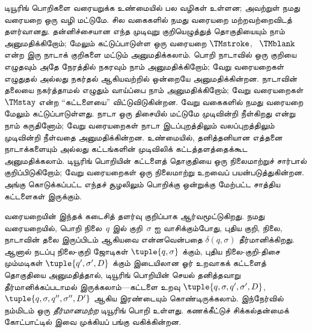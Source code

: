 \documentclass[../../../include/open-logic-section]{subfiles}
\begin{document}


டியூரிங் பொறிகளை வரையறுக்க உண்மையில் பல வழிகள் உள்ளன; அவற்றுள் நமது
வரையறை ஒரு வழி மட்டுமே. சில வகைகளில் நமது வரையறை மற்றவற்றைவிடத்
தளர்வானது. தன்னிச்சையான எந்த முடிவுறு குறியெழுத்துத் தொகுதியையும் நாம்
அனுமதிக்கிறோம்; மேலும் கட்டுப்பாடுள்ள ஒரு வரையறை $\TMstroke$,
~$\TMblank$ என்ற இரு நாடாக் குறிகளை மட்டும் அனுமதிக்கலாம். பொறி
நாடாவில் ஒரு குறியை எழுதவும் அதே நேரத்தில் நகரவும் நாம்
அனுமதிக்கிறோம்; வேறு வரையறைகள் எழுதுதல் அல்லது நகர்தல் ஆகியவற்றில்
ஒன்றையே அனுமதிக்கின்றன. நாடாவின் தலையை நகர்த்தாமல் எழுதும் வாய்ப்பை
நாம் அனுமதிக்கிறோம்; வேறு வரையறைகள் $\TMstay$ என்ற
``கட்டளையை'' விட்டுவிடுகின்றன. வேறு வகைகளில் நமது வரையறை மேலும்
கட்டுப்பாடுள்ளது. நாடா ஒரு திசையில் மட்டுமே முடிவின்றி நீள்கிறது என்று
நாம் கருதினோம்; வேறு வரையறைகள் நாடா இடப்புறத்திலும் வலப்புறத்திலும்
முடிவின்றி நீள்வதை அனுமதிக்கின்றன. உண்மையில், தனித்தனியான எத்தனை
நாடாக்களையும் அல்லது கட்டங்களின் முடிவிலிக் கட்டத்தளத்தைக்கூட
அனுமதிக்கலாம். டியூரிங் பொறியின் கட்டளைத் தொகுதியை ஒரு நிலைமாற்றுச்
சார்பால் குறிப்பிடுகிறோம்; வேறு வரையறைகள் ஒரு நிலைமாற்று உறவைப்
பயன்படுத்துகின்றன. அங்கு கொடுக்கப்பட்ட எந்தச் சூழலிலும் பொறிக்கு
ஒன்றுக்கு மேற்பட்ட சாத்திய கட்டளைகள் இருக்கும்.

வரையறையின் இந்தக் கடைசித் தளர்வு குறிப்பாக ஆர்வமூட்டுகிறது. நமது
வரையறையில், பொறி நிலை~$q$ இல் குறி~$\sigma$ ஐ வாசிக்கும்போது, புதிய
குறி, நிலை, நாடாவின் தலை இருப்பிடம் ஆகியவை என்னவென்பதை
$\delta(q, \sigma)$ தீர்மானிக்கிறது. ஆனால் நடப்பு நிலை-குறி ஜோடிகள்
$\tuple{q, \sigma}$ க்கும், புதிய நிலை-குறி-திசை மும்மடிகள்
$\tuple{q', \sigma', D}$ க்கும் இடையிலான ஓர் உறவாகக் கட்டளைத்
தொகுதியை அனுமதித்தால், டியூரிங் பொறியின் செயல் தனித்தவாறு
தீர்மானிக்கப்படாமல் இருக்கலாம்---கட்டளை உறவு $\tuple{q, \sigma, q',
\sigma', D}$, $\tuple{q, \sigma, q'', \sigma'', D'}$ ஆகிய இரண்டையும்
கொண்டிருக்கலாம். இந்நேர்வில் நம்மிடம் ஒரு \emph{தீர்மானமற்ற} டியூரிங்
பொறி உள்ளது. கணக்கீட்டுச் சிக்கல்தன்மைக் கோட்பாட்டில் இவை முக்கியப்
பங்கு வகிக்கின்றன.
\end{document}

